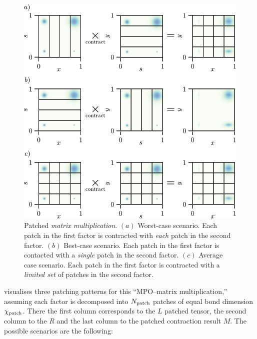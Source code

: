 \begin{figure}[ht!]
\centering
\includegraphics{figures/2DPatchMatMul.pdf}
\caption{Patched \textit{matrix multiplication}. $(a)$ Worst-case scenario. Each patch in the first factor is contracted with \textit{each} patch in the second factor. $(b)$ Best-case scenario. Each patch in the first factor is contacted with a \textit{single} patch in the second factor. $(c)$ Average case scenario. Each patch in the first factor is contracted with a \textit{limited set} of patches in the second factor.}
\label{fig:2DPatchMatMul}
\end{figure}

 visualises three patching patterns for this “MPO–matrix multiplication,” assuming each factor is decomposed into \(N_{\text{patch}} \) patches of equal bond dimension \(\chi_{\text{patch}}\). There the first column corresponds to the $L$ patched tensor, the second column to the $R$ and the last column to the patched contraction result $M$. The possible scenarios are the following:

